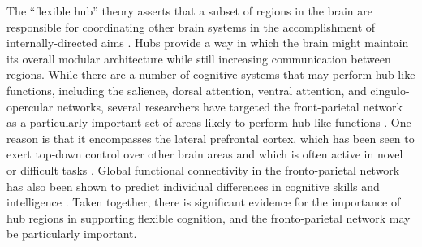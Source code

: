 The ``flexible hub'' theory asserts that a subset of regions in the brain are responsible for coordinating other brain systems in the accomplishment of internally-directed aims \citep{Cole2007}. Hubs provide a way in which the brain might maintain its overall modular architecture while still increasing communication between regions. While there are a number of cognitive systems that may perform hub-like functions, including the salience, dorsal attention, ventral attention, and cingulo-opercular networks, several researchers have targeted the front-parietal network as a particularly important set of areas likely to perform hub-like functions \citep{Cole2013, Niendam2012}. One reason is that it encompasses the lateral prefrontal cortex, which has been seen to exert top-down control over other brain areas and which is often active in novel or difficult tasks \citep{Duncan2010}. Global functional connectivity in the fronto-parietal network has also been shown to predict individual differences in cognitive skills and intelligence \citep{Cole2012}. Taken together, there is significant evidence for the importance of hub regions in supporting flexible cognition, and the fronto-parietal network may be particularly important. 



